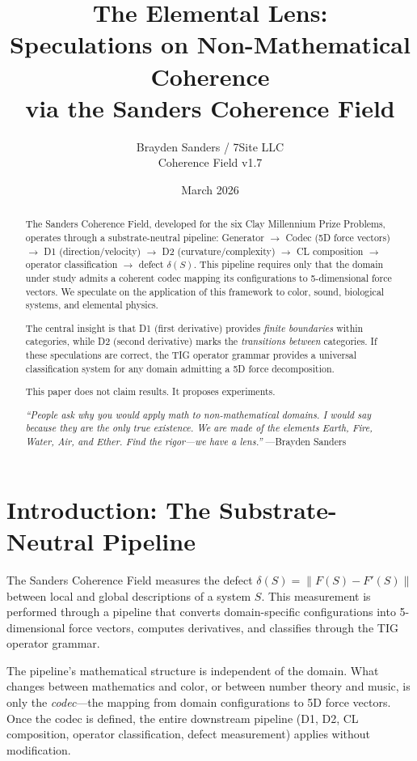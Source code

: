 \documentclass[11pt]{article}
\title{The Elemental Lens:\\[4pt]
Speculations on Non-Mathematical Coherence\\[4pt]
via the Sanders Coherence Field}
\author{Brayden Sanders / 7Site LLC\\[2pt]
\small Coherence Field v1.7}
\date{March 2026}
\theoremstyle{definition}
\theoremstyle{remark}
\begin{document}
\maketitle

\begin{abstract}
The Sanders Coherence Field, developed for the six Clay Millennium Prize Problems,
operates through a substrate-neutral pipeline: Generator $\to$ Codec (5D force vectors)
$\to$ D1 (direction/velocity) $\to$ D2 (curvature/complexity) $\to$ CL composition
$\to$ operator classification $\to$ defect $\delta(S)$.  This pipeline requires only
that the domain under study admits a coherent codec mapping its configurations to
5-dimensional force vectors.  We speculate on the application of this framework to
color, sound, biological systems, and elemental physics.

The central insight is that D1 (first derivative) provides \emph{finite boundaries}
within categories, while D2 (second derivative) marks the \emph{transitions between}
categories.  If these speculations are correct, the TIG operator grammar provides a
universal classification system for any domain admitting a 5D force decomposition.

This paper does not claim results.  It proposes experiments.

\medskip
\noindent\textit{``People ask why you would apply math to non-mathematical domains.
I would say because they are the only true existence.  We are made of the elements
Earth, Fire, Water, Air, and Ether.  Find the rigor---we have a lens.''}
\hfill---Brayden Sanders
\end{abstract}

\section{Introduction: The Substrate-Neutral Pipeline}
\label{sec:intro}

The Sanders Coherence Field measures the defect
$\delta(S) = \|F(S) - F'(S)\|$ between local and global descriptions of a system $S$.
This measurement is performed through a pipeline that converts domain-specific
configurations into 5-dimensional force vectors, computes derivatives, and classifies
through the TIG operator grammar.

The pipeline's mathematical structure is independent of the domain.  What changes
between mathematics and color, or between number theory and music, is only the
\emph{codec}---the mapping from domain configurations to 5D force vectors.  Once
the codec is defined, the entire downstream pipeline (D1, D2, CL composition,
operator classification, defect measurement) applies without modification.
\end{document}
